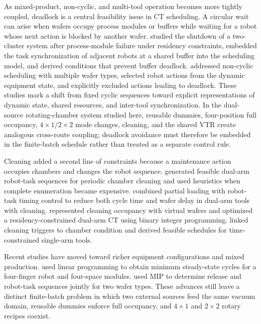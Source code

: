 \documentclass[final,5p,times,twocolumn]{elsarticle}
\begin{document}
As mixed-product, non-cyclic, and multi-tool operation becomes more tightly coupled, deadlock is a central feasibility issue in CT scheduling. A circular wait can arise when wafers occupy process modules or buffers while waiting for a robot whose next action is blocked by another wafer. \citet{zhu2025failuredeadlock} studied the shutdown of a two-cluster system after process-module failure under residency constraints, embedded the task synchronization of adjacent robots at a shared buffer into the scheduling model, and derived conditions that prevent buffer deadlock. \citet{kim2025noncyclicdeadlock} addressed non-cyclic scheduling with multiple wafer types, selected robot actions from the dynamic equipment state, and explicitly excluded actions leading to deadlock. These studies mark a shift from fixed cyclic sequences toward explicit representations of dynamic state, shared resources, and inter-tool synchronization. In the dual-source rotating-chamber system studied here, reusable dummies, four-position full occupancy, $4\times1/2\times2$ mode changes, cleaning, and the shared VTR create analogous cross-route coupling; deadlock avoidance must therefore be embedded in the finite-batch schedule rather than treated as a separate control rule.

Cleaning added a second line of constraints because a maintenance action occupies chambers and changes the robot sequence. \citet{kim2013cleaning} generated feasible dual-arm robot-task sequences for periodic chamber cleaning and used heuristics when complete enumeration became expensive. \citet{yu2020delay} combined partial loading with robot-task timing control to reduce both cycle time and wafer delay in dual-arm tools with cleaning. \citet{qiao2022binary} represented cleaning occupancy with virtual wafers and optimized a residency-constrained dual-arm CT using binary integer programming. \citet{li2022conditioncleaning} linked cleaning triggers to chamber condition and derived feasible schedules for time-constrained single-arm tools.

Recent studies have moved toward richer equipment configurations and mixed production. \citet{gu2024multifinger} used linear programming to obtain minimum steady-state cycles for a four-finger robot and four-space modules. \citet{yang2025miptwowafers} used MIP to determine release and robot-task sequences jointly for two wafer types. These advances still leave a distinct finite-batch problem in which two external sources feed the same vacuum domain, reusable dummies enforce full occupancy, and $4\times1$ and $2\times2$ rotary recipes coexist.
\end{document}
